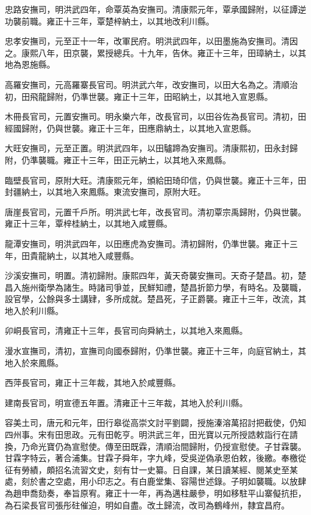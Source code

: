 \begin{pinyinscope}
忠路安撫司，明洪武四年，命覃英為安撫司。清康熙元年，覃承國歸附，以征譚逆功襲前職。雍正十三年，覃楚梓納土，以其地改利川縣。

忠孝安撫司，元至正十一年，改軍民府。明洪武四年，以田墨施為安撫司。清因之。康熙八年，田京襲，累授總兵。十九年，告休。雍正十三年，田璋納土，以其地為恩施縣。

高羅安撫司，元高羅寨長官司。明洪武六年，改安撫司，以田大名為之。清順治初，田飛龍歸附，仍準世襲。雍正十三年，田昭納土，以其地入宣恩縣。

木冊長官司，元置安撫司。明永樂六年，改長官司，以田谷佐為長官司。清初，田經國歸附，仍與世襲。雍正十三年，田應鼎納土，以其地入宣恩縣。

大旺安撫司，元至正置。明洪武四年，以田驢蹄為安撫司。清康熙初，田永封歸附，仍準襲職。雍正十三年，田正元納土，以其地入來鳳縣。

臨壁長官司，原附大旺。清康熙元年，頒給田琦印信，仍與世襲。雍正十三年，田封疆納土，以其地入來鳳縣。東流安撫司，原附大旺。

唐崖長官司，元置千戶所。明洪武七年，改長官司。清初覃宗禹歸附，仍與世襲。雍正十三年，覃梓桂納土，以其地入咸豐縣。

龍潭安撫司，明洪武四年，以田應虎為安撫司。清初歸附，仍準世襲。雍正十三年，田貴龍納土，以其地入咸豐縣。

沙溪安撫司，明置。清初歸附。康熙四年，黃天奇襲安撫司。天奇子楚昌。初，楚昌入施州衛學為諸生。時諸司爭並，民鮮知禮，楚昌折節力學，有時名。及襲職，設官學，公餘與多士講肄，多所成就。楚昌死，子正爵襲。雍正十三年，改流，其地入於利川縣。

卯峒長官司，清雍正十三年，長官司向舜納土，以其地入來鳳縣。

漫水宣撫司，清初，宣撫司向國泰歸附，仍準世襲。雍正十三年，向庭官納土，其地入於來鳳縣。

西萍長官司，雍正十三年裁，其地入於咸豐縣。

建南長官司，明宣德五年置。清雍正十三年裁，其地入於利川縣。

容美土司，唐元和元年，田行皋從高崇文討平劉闢，授施溱溶萬招討把截使，仍知四州事。宋有田思政。元有田乾亨。明洪武三年，田光寶以元所授誥敕詣行在請換，乃命光寶仍為宣慰使。傳至田既霖，清順治間歸附，仍授宣慰使。子甘霖襲。甘霖字特云，著合浦集。甘霖子舜年，字九峰，受吳逆偽承恩伯敕，後繳。奉檄從征有勞績，頗招名流習文史，刻有廿一史纂。日自課，某日讀某經、閱某史至某處，刻於書之空處，用小印志之。有白鹿堂集、容陽世述錄。子明如襲職。以放肆為趙申喬劾奏，奉旨原宥。雍正十一年，再為邁柱嚴參，明如移駐平山寨儗抗拒，為石梁長官司張彤砫催迫，明如自盡。改土歸流，改司為鶴峰州，隸宜昌府。


\end{pinyinscope}
